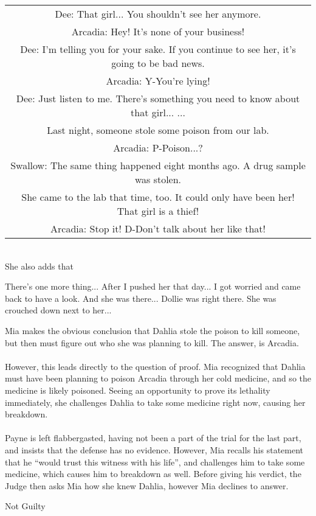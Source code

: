 \begin{tabular}{c}
Dee: That girl... You shouldn't see her anymore. \\
Arcadia: Hey! It's none of your business! \\
Dee: I'm telling you for your sake. If you continue to see her, it's going to be bad news. \\
Arcadia: Y-You're lying! \\
Dee: Just listen to me. There's something you need to know about that girl... ...\\
Last night, someone stole some poison from our lab. \\
Arcadia: P-Poison...?\\
Swallow: The same thing happened eight months ago. A drug sample was stolen. \\
She came to the lab that time, too. It could only have been her! That girl is a thief! \\
Arcadia: Stop it! D-Don't talk about her like that! \\
\end{tabular}\\
She also adds that
\begin{center}
There's one more thing... After I pushed her that day... I got worried and came back to have a look. And she was there... Dollie was right there. She was crouched down next to her... 
\end{center}
Mia makes the obvious conclusion that Dahlia stole the poison to kill someone, but then must figure out who she was planning to kill. The answer, is Arcadia. \\
\\
However, this leads directly to the question of proof. Mia recognized that Dahlia must have been planning to poison Arcadia through her cold medicine, and so the medicine is likely poisoned. Seeing an opportunity to prove its lethality immediately, she challenges Dahlia to take some medicine right now, causing her breakdown. \\
\\
Payne is left flabbergasted, having not been a part of the trial for the last part, and insists that the defense has no evidence. However, Mia recalls his statement that he ``would trust this witness with his life'', and challenges him to take some medicine, which causes him to breakdown as well. Before giving his verdict, the Judge then asks Mia how she knew Dahlia, however Mia declines to answer.

\begin{center}
{\Large Not Guilty}
\end{center}
